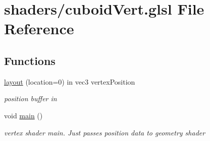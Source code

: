 \hypertarget{cuboid_vert_8glsl}{\section{shaders/cuboid\-Vert.glsl File Reference}
\label{cuboid_vert_8glsl}
}
\subsection*{Functions}
\begin{DoxyCompactItemize}
\item 
\hypertarget{cuboid_vert_8glsl_a3a9bed495f596aa8aed4121aacc43fdd}{\hyperlink{cuboid_vert_8glsl_a3a9bed495f596aa8aed4121aacc43fdd}{layout} (location=0) in vec3 vertex\-Position}\label{cuboid_vert_8glsl_a3a9bed495f596aa8aed4121aacc43fdd}

\begin{DoxyCompactList}\small\item\em position buffer in \end{DoxyCompactList}\item 
\hypertarget{cuboid_vert_8glsl_acdef7a1fd863a6d3770c1268cb06add3}{void \hyperlink{cuboid_vert_8glsl_acdef7a1fd863a6d3770c1268cb06add3}{main} ()}\label{cuboid_vert_8glsl_acdef7a1fd863a6d3770c1268cb06add3}

\begin{DoxyCompactList}\small\item\em vertex shader main. Just passes position data to geometry shader \end{DoxyCompactList}\end{DoxyCompactItemize}
